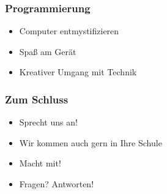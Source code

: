 \documentclass[12pt]{beamer}
\begin{document}
\begin{frame}
  \frametitle{Programmierung}
  \begin{itemize}
    \item<2-> Computer entmystifizieren
    \item<3-> Spaß am Gerät
    \item<4-> Kreativer Umgang mit Technik
  \end{itemize}
\end{frame}

\begin{frame}
  \frametitle{Zum Schluss}
  \begin{itemize}
    \item Sprecht uns an!
    \item Wir kommen auch gern in Ihre Schule
    \item Macht mit!
    \item Fragen? Antworten!
  \end{itemize}
\end{frame}
\end{document}
